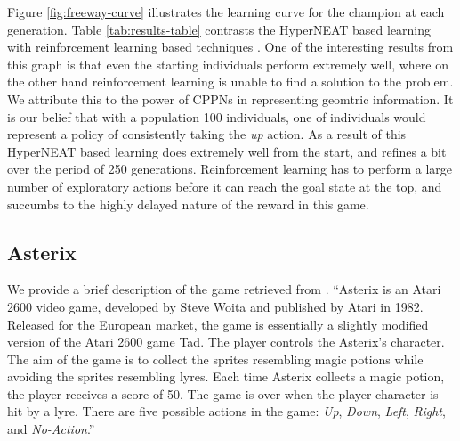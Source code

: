 \documentclass{acm_proc_article-sp}
\begin{document}
Figure \ref{fig:freeway-curve} illustrates the learning curve for the champion at each generation. Table \ref{tab:results-table} contrasts the HyperNEAT based learning with reinforcement learning based techniques \cite{naddaf10}. One of the interesting results from this graph is that even the starting individuals perform extremely well, where on the other hand reinforcement learning is unable to find a solution to the problem. We attribute this to the power of CPPNs in representing geomtric information. It is our belief that with a population 100 individuals, one of individuals would represent a policy of consistently taking the \textit{up} action. As a result of this HyperNEAT based learning does extremely well from the start, and refines a bit over the period of 250 generations. Reinforcement learning has to perform a large number of exploratory actions before it can reach the goal state at the top, and succumbs to the highly delayed nature of the reward in this game.

\subsection {Asterix}
We provide a brief description of the game retrieved from \cite{naddaf10}. ``Asterix is an Atari 2600 video game, developed by Steve Woita and published by Atari in 1982. Released for the European market, the game is essentially a slightly modified version of the Atari 2600 game Tad. The player controls the Asterix’s character. The aim of the game is to collect the sprites resembling magic potions while avoiding the sprites resembling lyres. Each time Asterix collects a magic potion, the player receives a score of 50. The game is over when the player character is hit by a lyre. There are five possible actions in the game: \textit{Up}, \textit{Down}, \textit{Left}, \textit{Right}, and \textit{No-Action}.''
\end{document}
